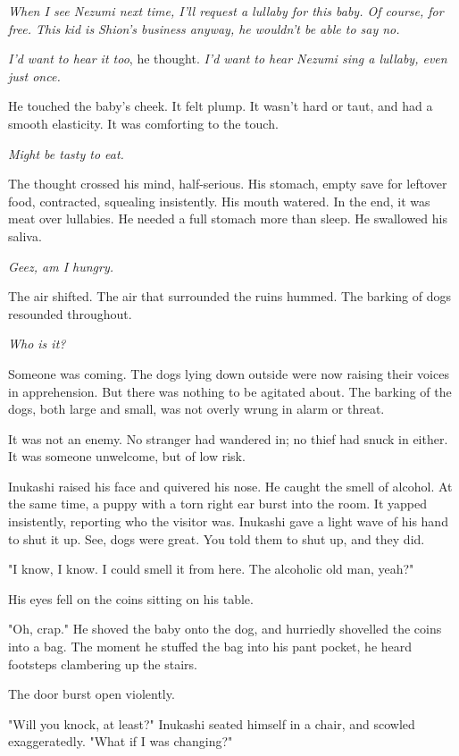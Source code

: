 \emph{When I see Nezumi next time, I'll request a lullaby for this baby. Of
course, for free. This kid is Shion's business anyway, he wouldn't be
able to say no.}

\emph{I'd want to hear it too}, he thought. \emph{I'd want to hear Nezumi sing a
lullaby, even just once.}

He touched the baby's cheek. It felt plump. It wasn't hard or taut, and
had a smooth elasticity. It was comforting to the touch.

\emph{Might be tasty to eat.}

The thought crossed his mind, half-serious. His stomach, empty save for
leftover food, contracted, squealing insistently. His mouth watered. In
the end, it was meat over lullabies. He needed a full stomach more than
sleep. He swallowed his saliva.

\emph{Geez, am I hungry.}

The air shifted. The air that surrounded the ruins hummed. The barking
of dogs resounded throughout.

\emph{Who is it?}

\mybreak

Someone was coming. The dogs lying down outside were now raising their
voices in apprehension. But there was nothing to be agitated about. The
barking of the dogs, both large and small, was not overly wrung in alarm
or threat.

It was not an enemy. No stranger had wandered in; no thief had snuck in
either. It was someone unwelcome, but of low risk.

Inukashi raised his face and quivered his nose. He caught the smell of
alcohol. At the same time, a puppy with a torn right ear burst into the
room. It yapped insistently, reporting who the visitor was. Inukashi
gave a light wave of his hand to shut it up. See, dogs were great. You
told them to shut up, and they did.

"I know, I know. I could smell it from here. The alcoholic old man,
yeah?"

His eyes fell on the coins sitting on his table.

"Oh, crap." He shoved the baby onto the dog, and hurriedly shovelled the
coins into a bag. The moment he stuffed the bag into his pant pocket, he
heard footsteps clambering up the stairs.

The door burst open violently.

"Will you knock, at least?" Inukashi seated himself in a chair, and
scowled exaggeratedly. "What if I was changing?"

